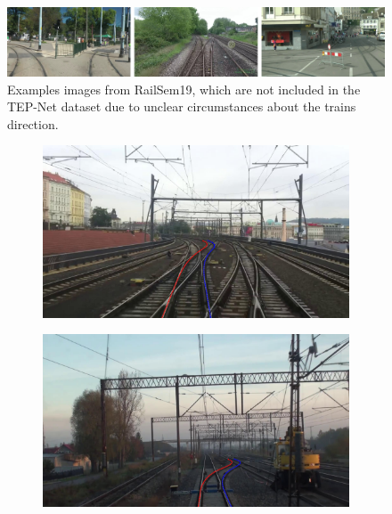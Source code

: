 \begin{figure}[H]
    \centering
    \includegraphics[width=\linewidth]{PICs/TEP-Net dataset bilder aussortiert.png}
    \caption{Examples images from RailSem19, which are not included in the \ac{TEP}-Net dataset due to unclear circumstances about the trains direction. \cite{tepNet2024}}
    \label{tep-net_aussortiert}
\end{figure}


\begin{figure}[H]
    \centering
    
    \begin{subfigure}{0.328\textwidth}
        \includegraphics[width=\linewidth]{PICs/annotated_rs00007.jpg}
    \end{subfigure}
    \hfill
    \begin{subfigure}{0.328\textwidth}
        \includegraphics[width=\linewidth]{PICs/annotated_rs00107.jpg}

\end{subfigure}
\end{figure}
